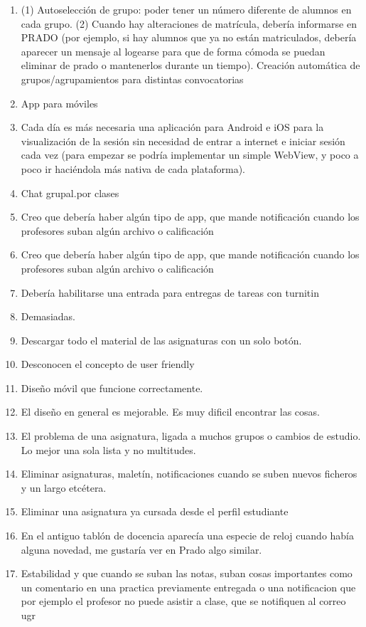 \begin{enumerate}
\item (1) Autoselección de grupo: poder tener un número diferente de alumnos en cada grupo. (2) Cuando hay alteraciones de matrícula, debería informarse en PRADO (por ejemplo, si hay alumnos que ya no están matriculados, debería aparecer un mensaje al logearse para que de forma cómoda se puedan eliminar de prado o mantenerlos durante un tiempo). Creación automática de grupos/agrupamientos para distintas convocatorias
\item App para móviles
\item Cada día es más necesaria una aplicación para Android e iOS para la visualización de la sesión sin necesidad de entrar a internet e iniciar sesión cada vez (para empezar se podría implementar un simple WebView, y poco a poco ir haciéndola más nativa de cada plataforma).
\item Chat grupal.por clases
\item Creo que debería haber algún tipo de app, que mande notificación cuando los profesores suban algún archivo o calificación
\item Creo que debería haber algún tipo de app, que mande notificación cuando los profesores suban algún archivo o calificación
\item Debería habilitarse una entrada para entregas de tareas con turnitin
\item Demasiadas.
\item Descargar todo el material de las asignaturas con un solo botón.
\item Desconocen el concepto de user friendly
\item Diseño móvil que funcione correctamente.
\item El diseño en general es mejorable. Es muy dificil encontrar las cosas.
\item El problema de una asignatura, ligada a muchos grupos o cambios de estudio. Lo mejor una sola lista y no multitudes.
\item Eliminar asignaturas, maletín, notificaciones cuando se suben nuevos ficheros y un largo etcétera.
\item Eliminar una asignatura ya cursada desde el perfil estudiante
\item En el antiguo tablón de docencia aparecía una especie de reloj cuando había alguna novedad, me gustaría ver en Prado algo similar.
\item Estabilidad y que cuando se suban las notas, suban cosas importantes como un comentario en una practica previamente entregada o una notificacion que por ejemplo el profesor no puede asistir a clase, que se notifiquen al correo ugr

\end{enumerate}
